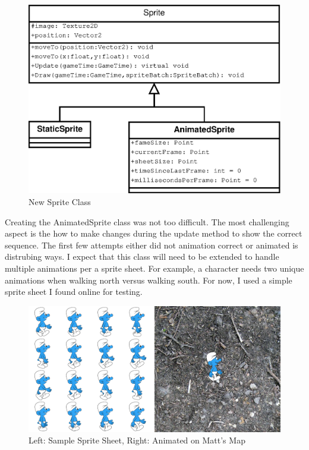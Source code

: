 \documentclass[]{article}
\begin{document}
			\begin{figure}[H]
				\centering
				\includegraphics[scale=0.50]{UML/Sprite}
				\caption{New Sprite Class}				
			\end{figure}
			
			Creating the AnimatedSprite class was not too difficult.  The most challenging aspect is the how to make changes during the update method to show the correct sequence.  The first few attempts either did not animation correct or animated is distrubing ways.  I expect that this class will need to be extended to handle multiple animations per a sprite sheet.  For example,  a character needs two unique animations when walking north versus walking south.  For now, I used a simple sprite sheet I found online for testing.
			
			\begin{figure}[H]
				\centering
				\includegraphics[scale=0.40]{UML/SpriteSampleScreen}
				\caption{Left: Sample Sprite Sheet, Right: Animated on Matt's Map}
			\end{figure}
			
\end{document}
